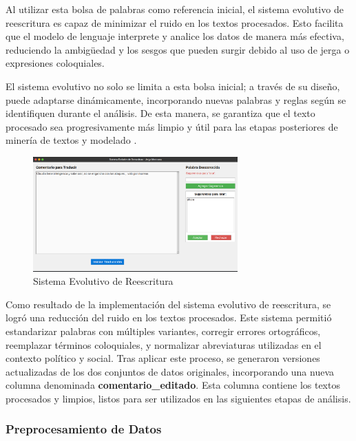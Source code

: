 \documentclass[10pt, a4paper]{article}
\begin{document}
	Al utilizar esta bolsa de palabras como referencia inicial, el sistema evolutivo de reescritura es capaz de minimizar el ruido en los textos procesados. Esto facilita que el modelo de lenguaje interprete y analice los datos de manera más efectiva, reduciendo la ambigüedad y los sesgos que pueden surgir debido al uso de jerga o expresiones coloquiales.
	
	El sistema evolutivo no solo se limita a esta bolsa inicial; a través de su diseño, puede adaptarse dinámicamente, incorporando nuevas palabras y reglas según se identifiquen durante el análisis. De esta manera, se garantiza que el texto procesado sea progresivamente más limpio y útil para las etapas posteriores de minería de textos y modelado \parencite{galindo1991sistemas}.
	
	\begin{figure}[h!] %
		\centering
		\includegraphics[width=0.7\textwidth]{evolutivo.png} %
		\caption{Sistema Evolutivo de Reescritura} %
		\label{fig:evolutivo} %
	\end{figure}
	
	Como resultado de la implementación del sistema evolutivo de reescritura, se logró una reducción del ruido en los textos procesados. Este sistema permitió estandarizar palabras con múltiples variantes, corregir errores ortográficos, reemplazar términos coloquiales, y normalizar abreviaturas utilizadas en el contexto político y social. Tras aplicar este proceso, se generaron versiones actualizadas de los dos conjuntos de datos originales, incorporando una nueva columna denominada \textbf{comentario\_editado}. Esta columna contiene los textos procesados y limpios, listos para ser utilizados en las siguientes etapas de análisis.
	
	\subsubsection{Preprocesamiento de Datos}
	
\end{document}
